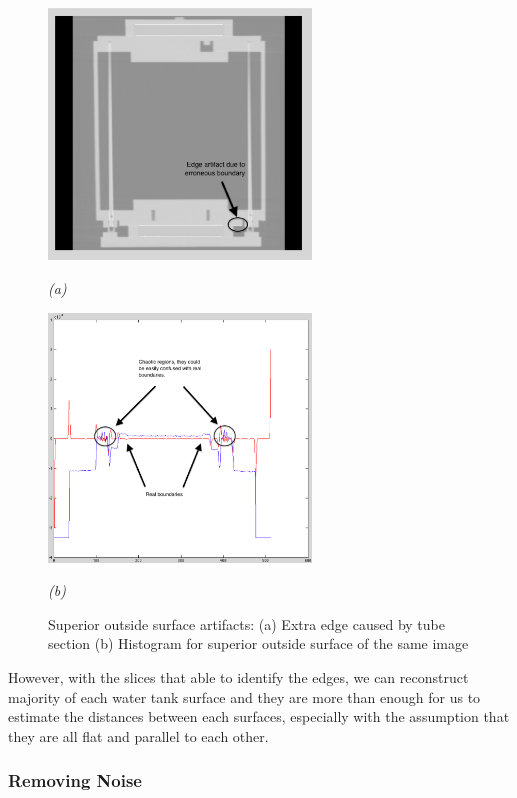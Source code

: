\begin{figure}[htb]
  \begin{minipage}[b]{2.75in}
    \centering
    \centerline{\mbox{\includegraphics[width=2.75in]{data_extraction/images/sample/20121017_125/Coronal/Superior_outside/extra_edge.eps}}}
    \centerline{\emph{(a)}}
  \end{minipage}
  \begin{minipage}[b]{2.75in}
    \centering
    \centerline{\mbox{\includegraphics[width=2.75in]{data_extraction/images/sample/20121017_125/Coronal/Superior_outside/extra_edge_histogram.eps}}}
    \centerline{\emph{(b)}}
  \end{minipage}
  \caption{Superior outside surface artifacts: (a) Extra edge caused by tube section (b) Histogram for superior outside surface of the same image}
  \label{fig:superior_outside_artifacts}
\end{figure}

However, with the slices that able to identify the edges,
we can reconstruct majority of each water tank surface and they are more than enough for us to estimate the
distances between each surfaces, especially with the assumption that they are all flat and parallel to each
other.

\subsubsection{Removing Noise}

